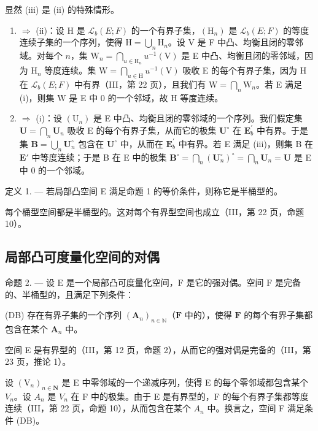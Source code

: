 显然 (iii) 是 (ii) 的特殊情形。

\begin{enumerate}
\def\labelenumi{(\roman{enumi})}
\item
  \(\Rightarrow\) (ii)：设 H 是 \(\mathcal{L}_b(E;F)\) 的一个有界子集，\((\mathrm{H}_n)\) 是 \(\mathcal{L}_b(E;F)\) 的等度连续子集的一个序列，使得 \(\mathrm{H} = \bigcup_{n}\mathrm{H}_{n}\)。设 V 是 F 中凸、均衡且闭的零邻域。对每个 \(n\)，集 \(\mathrm{W}_n = \bigcap_{u\in \mathrm{H}_n}u^{-1}(\mathrm{V})\) 是 E 中凸、均衡且闭的零邻域，因为 \(\mathrm{H}_n\) 等度连续。集 \(\mathrm{W} = \bigcap_{u\in \mathrm{H}}u^{-1}(\mathrm{V})\) 吸收 E 的每个有界子集，因为 H 在 \(\mathcal{L}_b(E;F)\) 中有界（III，第 22 页），且我们有 \(\mathrm{W} = \bigcap_{n}\mathrm{W}_{n}\)。若 E 满足 (i)，则集 W 是 E 中 0 的一个邻域，故 H 等度连续。
\item
  \(\Rightarrow\) (i)：设 \((\mathrm{U}_n)\) 是 E 中凸、均衡且闭的零邻域的一个序列。我们假定集 \(\mathbf{U} = \bigcap_{n}\mathbf{U}_{n}\) 吸收 E 的每个有界子集，从而它的极集 \(\mathbf{U}^{\circ}\) 在 \(\mathbf{E}_b^\prime\) 中有界。于是集 \(\mathbf{B} = \bigcup_{n}\mathbf{U}_{n}^{\circ}\) 包含在 \(\mathbf{U}^{\circ}\) 中，从而在 \(\mathbf{E}_b^\prime\) 中有界。若 E 满足 (iii)，则集 B 在 \(\mathbf{E}'\) 中等度连续；于是 B 在 E 中的极集 \(\mathbf{B}^{\circ} = \bigcap_{n}(\mathbf{U}_{n}^{\circ})^{\circ} = \bigcap_{n}\mathbf{U}_{n} = \mathbf{U}\) 是 E 中 0 的一个邻域。
\end{enumerate}

定义 1. --- 若局部凸空间 E 满足命题 1 的等价条件，则称它是半桶型的。

每个桶型空间都是半桶型的。这对每个有界型空间也成立（III，第 22 页，命题 10）。

\subsection{局部凸可度量化空间的对偶}

命题 2. --- 设 E 是一个局部凸可度量化空间，F 是它的强对偶。空间 F 是完备的、半桶型的，且满足下列条件：

(DB) 存在有界子集的一个序列 \((\mathbf{A}_n)_{n\in \mathbb{N}}\)（\(\mathbf{F}\) 中的），使得 \(\mathbf{F}\) 的每个有界子集都包含在某个 \(\mathbf{A}_n\) 中。

空间 E 是有界型的（III，第 12 页，命题 2），从而它的强对偶是完备的（III，第 23 页，推论 1）。

设 \((\mathrm{V}_{n})_{n\in\mathbf{N}}\) 是 E 中零邻域的一个递减序列，使得 E 的每个零邻域都包含某个 \(V_{n}\)。设 \(A_{n}\) 是 \(V_{n}\) 在 F 中的极集。由于 E 是有界型的，F 的每个有界子集都等度连续（III，第 22 页，命题 10），从而包含在某个 \(A_{n}\) 中。换言之，空间 F 满足条件 (DB)。


